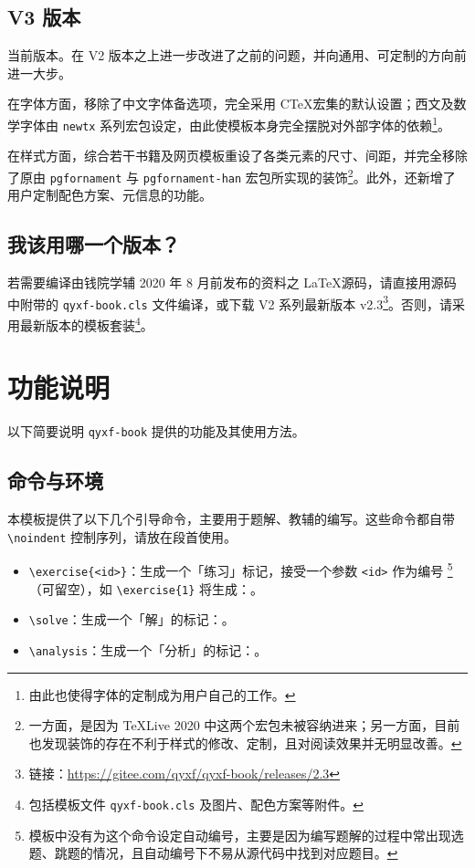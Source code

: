 \documentclass[
    10pt,
    oneside,
    openany,
    b5paper,
    colorscheme = basic  %
]{qyxf-book}
\begin{document}
\subsection{V3 版本}

当前版本。在 V2 版本之上进一步改进了之前的问题，并向通用、可定制的方向前进一大步。

在字体方面，移除了中文字体备选项，完全采用 C\TeX 宏集的默认设置；西文及数学字体由 \verb|newtx| 系列宏包设定，由此使模板本身完全摆脱对外部字体的依赖\footnote{由此也使得字体的定制成为用户自己的工作。}。

在样式方面，综合若干书籍及网页模板重设了各类元素的尺寸、间距，并完全移除了原由 \verb|pgfornament| 与 \verb|pgfornament-han| 宏包所实现的装饰\footnote{一方面，是因为 \TeX Live 2020 中这两个宏包未被容纳进来；另一方面，目前也发现装饰的存在不利于样式的修改、定制，且对阅读效果并无明显改善。}。此外，还新增了用户定制配色方案、元信息的功能。

\subsection{我该用哪一个版本？}

若需要编译由钱院学辅 2020 年 8 月前发布的资料之 \LaTeX 源码，请直接用源码中附带的 \verb|qyxf-book.cls| 文件编译，或下载 V2 系列最新版本 v2.3\footnote{链接：\url{https://gitee.com/qyxf/qyxf-book/releases/2.3}}。否则，请采用最新版本的模板套装\footnote{包括模板文件 \texttt{qyxf-book.cls} 及图片、配色方案等附件。}。

\section{功能说明}

以下简要说明 \verb|qyxf-book| 提供的功能及其使用方法。

\subsection{命令与环境}

本模板提供了以下几个引导命令，主要用于题解、教辅的编写。这些命令都自带 \verb|\noindent| 控制序列，请放在段首使用。

\begin{itemize}
  \item \verb|\exercise{<id>}|：生成一个「练习」标记，接受一个参数 \verb|<id>| 作为编号
  \footnote{模板中没有为这个命令设定自动编号，主要是因为编写题解的过程中常出现选题、跳题的情况，且自动编号下不易从源代码中找到对应题目。}
  （可留空），如 \verb|\exercise{1}| 将生成：。
  \item \verb|\solve|：生成一个「解」的标记：\solve。
  \item \verb|\analysis|：生成一个「分析」的标记：\analysis。
\end{itemize}
\end{document}
